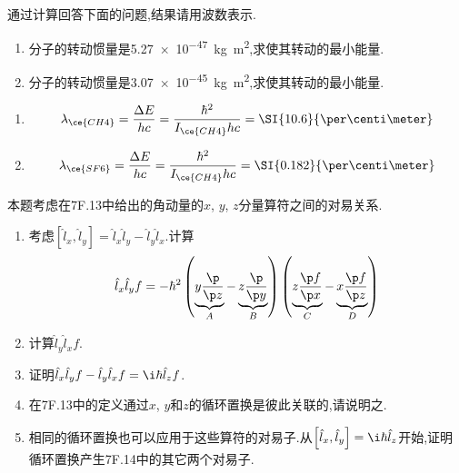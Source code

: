 \documentclass{ctexart}
\begin{document}
\begin{homework}[18.]
    通过计算回答下面的问题,结果请用波数表示.
    \begin{enumerate}[label=(\alph*)]
        \item {}分子的转动惯量是\SI{5.27e-47}{\kilogram\meter\squared},求使其转动的最小能量.
        \item {}分子的转动惯量是\SI{3.07e-45}{\kilogram\meter\squared},求使其转动的最小能量.
    \end{enumerate}
\end{homework}
\begin{solution}
\begin{enumerate}[label=(\alph*)]
    \item
    \[\lambda_{\ce{CH4}}=\dfrac{\Delta E}{hc}=\dfrac{\hbar^2}{I_{\ce{CH4}}hc}=\SI{10.6}{\per\centi\meter}\]
    \item
    \[\lambda_{\ce{SF6}}=\dfrac{\Delta E}{hc}=\dfrac{\hbar^2}{I_{\ce{CH4}}hc}=\SI{0.182}{\per\centi\meter}\]
\end{enumerate}
\end{solution}
\begin{homework}[19.]
    本题考虑在7F.13中给出的角动量的$x$, $y$, $z$分量算符之间的对易关系.
    \begin{enumerate}[label=(\alph*)]
        \item 考虑$\left[\hat{l}_x,\hat{l}_y\right]=\hat{l}_x\hat{l}_y-\hat{l}_y\hat{l}_x$.计算
        \[\hat{l}_x\hat{l}_yf=-\hbar^2\left(\underbrace{y\dfrac{\p}{\p z}}_{A}-\underbrace{z\dfrac{\p}{\p y}}_{B}\right)\left(\underbrace{z\dfrac{\p f}{\p x}}_{C}-\underbrace{x\dfrac{\p f}{\p z}}_{D}\right)\]
        \item 计算$\hat{l}_y\hat{l}_xf$.
        \item 证明$\hat{l}_x\hat{l}_yf-\hat{l}_y\hat{l}_xf=\i\hbar\hat{l}_zf$.
        \item 在7F.13中的定义通过$x$, $y$和$z$的循环置换是彼此关联的,请说明之.
        \item 相同的循环置换也可以应用于这些算符的对易子.从$\left[\hat{l}_x,\hat{l}_y\right]=\i\hbar\hat{l}_z$开始,证明循环置换产生7F.14中的其它两个对易子.
    \end{enumerate}
\end{homework}
\end{document}
